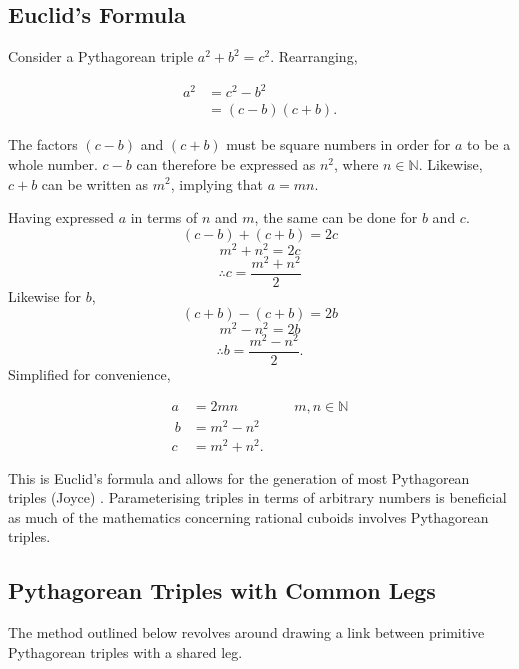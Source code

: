 \documentclass[11pt]{article}
\begin{document}
\subsection{Euclid's Formula}
Consider a Pythagorean triple $a^2+b^2=c^2$. Rearranging,

\begin{equation*}
\begin{aligned}
a^2 &= c^2-b^2 \\
&= (c-b)(c+b).
\end{aligned}
\end{equation*}

The factors $(c-b)$ and $(c+b)$ must be square numbers in order for  $a$ to be a whole number. $c-b$ can therefore be expressed as $n^2$, where $n\in{\mathbb{N}}$.
Likewise, $c+b$ can be written as $m^2$, implying that $a=mn$.

Having expressed $a$ in terms of $n$ and $m$, the same can be done for $b$ and $c$.
$$(c-b)+(c+b)=2c$$
$$m^2+n^2=2c$$
$$\therefore c=\frac{m^2+n^2}{2}$$
Likewise for $b$,
$$(c+b)-(c+b)=2b$$
$$m^2-n^2=2b$$
$$\therefore b=\frac{m^2-n^2}{2}.$$
Simplified for convenience, 

\begin{equation}
\begin{aligned}
a &= 2mn     \qquad\qquad m, n \in{\mathbb{N}}\\\
b &= m^2-n^2 \\
c &= m^2+n^2.
\end{aligned}
\label{eq:2}
\end{equation}

This is Euclid's formula and allows for the generation of most Pythagorean triples (Joyce) \cite{euclidsformula}. Parameterising triples in terms of arbitrary numbers is beneficial as much of the mathematics concerning rational cuboids involves Pythagorean triples.

\subsection{Pythagorean Triples with Common Legs}
The method outlined below revolves around drawing a link between primitive Pythagorean triples with a shared leg.
\end{document}
